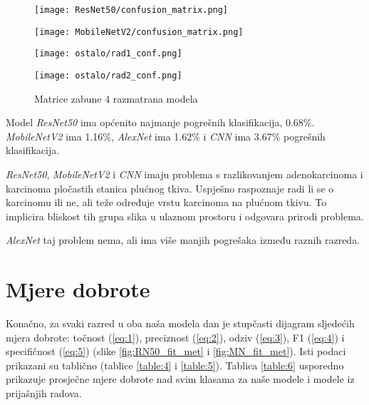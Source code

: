 \documentclass[conference, utf8]{IEEEtran}
\begin{document}
	
	\begin{figure}[H]
		
		\begin{center}
			\begin{minipage}{0.49\columnwidth}
				\texttt{[image: ResNet50/confusion\_matrix.png]}
				\label{conf:1}
			\end{minipage}
			\begin{minipage}{0.49\columnwidth}
				\texttt{[image: MobileNetV2/confusion\_matrix.png]}
				\label{conf:2}
			\end{minipage}
			\begin{minipage}{0.49\columnwidth}
				\texttt{[image: ostalo/rad1\_conf.png]}
				\label{conf:3}
			\end{minipage}
			\begin{minipage}{0.49\columnwidth}
				\texttt{[image: ostalo/rad2\_conf.png]}
				\label{conf:4}
			\end{minipage}
			
			
		\end{center}
		
		\caption{Matrice zabune 4 razmatrana modela}
		
	\end{figure}
	
	Model \textit{ResNet50} ima općenito najmanje pogrešnih klasifikacija, 0.68\%. \textit{MobileNetV2} ima 1.16\%, \textit{AlexNet}\cite{RAD1} ima 1.62\%  i \textit{CNN}\cite{RAD2} ima 3.67\% pogrešnih klasifikacija. 
	
	\textit{ResNet50}, \textit{MobileNetV2} i \textit{CNN}\cite{RAD2} imaju problema s razlikovanjem adenokarcinoma i karcinoma pločastih stanica plućnog tkiva. Uspješno raspoznaje radi li se o karcinomu ili ne, ali teže određuje vrstu karcinoma na plućnom tkivu. To implicira bliskost tih grupa slika u ulaznom prostoru i odgovara prirodi problema.
	
	\textit{AlexNet}\cite{RAD1} taj problem nema, ali ima više manjih pogrešaka između raznih razreda. 
	
	
	\section{Mjere dobrote}
	Konačno, za svaki razred u oba naša modela dan je stupčasti dijagram sljedećih mjera dobrote: točnost (\ref{eq:1}), preciznost (\ref{eq:2}), odziv (\ref{eq:3}), F1 (\ref{eq:4}) i specifičnost (\ref{eq:5}) (slike \ref{fig:RN50_fit_met} i \ref{fig:MN_fit_met}). Isti podaci prikazani su tablično (tablice \ref{table:4} i \ref{table:5}). Tablica \ref{table:6} usporedno prikazuje prosječne mjere dobrote nad svim klasama za naše modele i modele iz prijašnjih radova.
	
\end{document}
